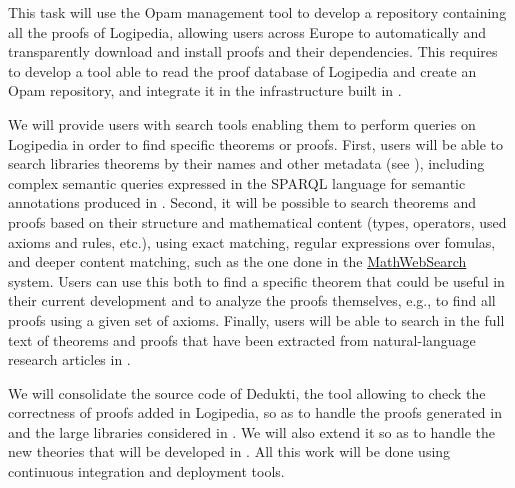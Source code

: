 \begin{workpackage}[id=access,wphases=0-48,type=MGT,
  short=Access,%
  title={Access to the infrastructure},
  lead=Irt,IrtRM=23,OcaRM=6,EduRM=12,InrRM=18]
\begin{tasklist}
\begin{task}[id=opam,
      title=Giving access to the infrastructure in proof tools,
      lead=Oca,
      OcaRM=6]
    This task will use the Opam management tool to develop a
    repository containing all the proofs of Logipedia, allowing users
    across Europe to automatically and transparently download and
    install proofs and their dependencies. This
    requires to develop a tool able to read the proof
    database of Logipedia and create an Opam repository,
    and integrate it in the infrastructure built in .
  \end{task}

  \begin{task}[id=search,
      title=Providing search tools,
      lead=Inr,InrRM=18]
    We will provide users with search tools enabling them to perform
    queries on Logipedia in order to find specific theorems or proofs.
    First, users will be able to search libraries theorems by their
    names and other metadata (see ),
    including complex semantic queries expressed in the SPARQL
    language for semantic annotations produced in
    . Second, it will be possible to
    search theorems and proofs based on their structure and
    mathematical content (types, operators, used axioms and rules,
    etc.), using exact matching, regular expressions over fomulas, and
    deeper content matching, such as the one done in the
    \hyperlink{https://kwarc.info/systems/mws/}{MathWebSearch}
    system. Users can use this both to find a specific theorem that
    could be useful in their current development and to analyze the
    proofs themselves, e.g., to find all proofs using a given set of
    axioms.  Finally, users will be able to search in the full text of
    theorems and proofs that have been extracted from natural-language
    research articles in .
  \end{task}

  \begin{task}[id=dedukti,
      title=Development of Dedukti checking and translation tools,
      lead=Inr,InrRM=24]
    We will consolidate the source code of Dedukti, the tool allowing
    to check the correctness of proofs added in Logipedia, so as to
    handle the proofs generated in  and the
    large libraries considered in . We will also
    extend it so as to handle the new theories that will be developed
    in .
    All this work will be done using continuous integration and
    deployment tools.
  \end{task}
  

\end{tasklist}
\end{workpackage}
